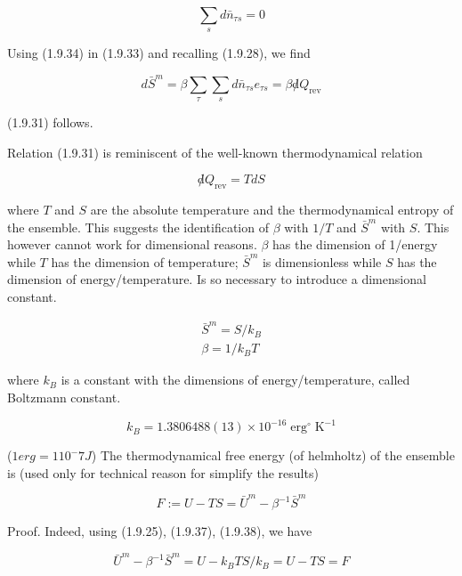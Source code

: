 \documentclass{article}
\begin{document}
\begin{equation*}
\sum_{s} d \bar{n}_{\tau s}=0 \tag{1.9.34}
\end{equation*}
 

Using (1.9.34) in (1.9.33) and recalling (1.9.28), we find
 
\begin{equation*}
d \bar{S}^{m}=\beta \sum_{\tau} \sum_{s} d \bar{n}_{\tau s} e_{\tau s}=\beta \not d Q_{\mathrm{rev}} \tag{1.9.35}
\end{equation*}
 
(1.9.31) follows.

Relation (1.9.31) is reminiscent of the well-known thermodynamical relation

\begin{equation}
\not d Q_{\mathrm{rev}}=T d S \tag{1.9.36}
\end{equation}

where $T$ and $S$ are the absolute temperature and the thermodynamical entropy of the ensemble. This suggests the identification of $\beta$ with $1 / T$ and $\bar{S}^{m}$ with $S$. This however cannot work for dimensional reasons. $\beta$ has the dimension of 1/energy while $T$ has the dimension of temperature; $\bar{S}^{m}$ is dimensionless while $S$ has the dimension of energy/temperature. Is so necessary to introduce a dimensional constant.

\begin{gather*}
\bar{S}^{m}=S / k_{B}  \tag{1.9.37}\\
\beta=1 / k_{B} T \tag{1.9.38}
\end{gather*}

where $k_{B}$ is a constant with the dimensions of energy/temperature, called Boltzmann constant.

\begin{equation*}
k_{B}=1.3806488(13) \times 10^{-16} \operatorname{erg}^{\circ} \mathrm{K}^{-1} \tag{1.9.39}
\end{equation*}

($1 erg= 1 10^-7J$)
The thermodynamical free energy (of helmholtz) of the ensemble is (used only for technical reason for simplify the results)

\begin{equation*}
F:=U-T S=\bar{U}^{m}-\beta^{-1} \bar{S}^{m} \tag{1.9.40}
\end{equation*}


Proof. Indeed, using (1.9.25), (1.9.37), (1.9.38), we have

\begin{equation*}
\bar{U}^{m}-\beta^{-1} \bar{S}^{m}=U-k_{B} T S / k_{B}=U-T S=F \tag{1.9.41}
\end{equation*}
\end{document}
